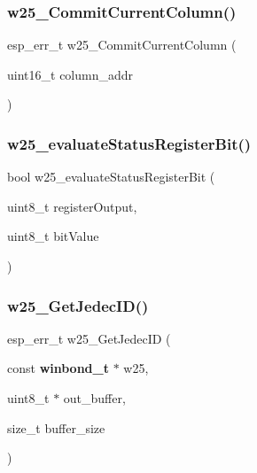 \subsubsection{w25\+\_\+\+Commit\+Current\+Column()}
{\footnotesize\ttfamily esp\+\_\+err\+\_\+t w25\+\_\+\+Commit\+Current\+Column (\begin{DoxyParamCaption}\item[{uint16\+\_\+t}]{column\+\_\+addr }\end{DoxyParamCaption})}

\mbox{\label{_w25_n01_g_v_8h_aa0de5ea92ff19da9bd3efdf057c01e6d}} 
\subsubsection{w25\+\_\+evaluate\+Status\+Register\+Bit()}
{\footnotesize\ttfamily bool w25\+\_\+evaluate\+Status\+Register\+Bit (\begin{DoxyParamCaption}\item[{uint8\+\_\+t}]{register\+Output,  }\item[{uint8\+\_\+t}]{bit\+Value }\end{DoxyParamCaption})}

\mbox{\label{_w25_n01_g_v_8h_a59711eeea7d2ba8d056f644370bfad21}} 
\subsubsection{w25\+\_\+\+Get\+Jedec\+I\+D()}
{\footnotesize\ttfamily esp\+\_\+err\+\_\+t w25\+\_\+\+Get\+Jedec\+ID (\begin{DoxyParamCaption}\item[{const \textbf{ winbond\+\_\+t} $\ast$}]{w25,  }\item[{uint8\+\_\+t $\ast$}]{out\+\_\+buffer,  }\item[{size\+\_\+t}]{buffer\+\_\+size }\end{DoxyParamCaption})}

\mbox{\label{_w25_n01_g_v_8h_a1eda1a8b962fdbe6cd545175f0d7cdd5}} 
